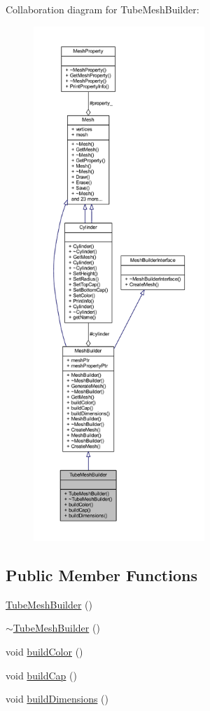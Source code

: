 Collaboration diagram for Tube\+Mesh\+Builder\+:\nopagebreak
\begin{figure}[H]
\begin{center}
\leavevmode
\includegraphics[height=550pt]{class_tube_mesh_builder__coll__graph}
\end{center}
\end{figure}
\subsection*{Public Member Functions}
\begin{DoxyCompactItemize}
\item 
\mbox{\hyperlink{class_tube_mesh_builder_a9c572de4c460791841bae4aa72b076c8}{Tube\+Mesh\+Builder}} ()
\item 
\mbox{\hyperlink{class_tube_mesh_builder_a5a16887f9378a04355819176a1cd2f98}{$\sim$\+Tube\+Mesh\+Builder}} ()
\item 
void \mbox{\hyperlink{class_tube_mesh_builder_afcdbd454d1ba0c3eed4efb5120783e08}{build\+Color}} ()
\item 
void \mbox{\hyperlink{class_tube_mesh_builder_a7763461e42bd9db6b7d69eb5c7ad4e05}{build\+Cap}} ()
\item 
void \mbox{\hyperlink{class_tube_mesh_builder_a16c5008efeefa80378f86b2a8e116af4}{build\+Dimensions}} ()
\end{DoxyCompactItemize}
